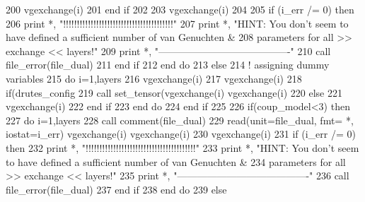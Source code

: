 \begin{DoxyCode}
200             vgexchange(i)%
201 \textcolor{keywordflow}{        end if}
202 
203         vgexchange(i)%
204 
205         \textcolor{keywordflow}{if} (i\_err /= 0) \textcolor{keywordflow}{then}
206           print *, \textcolor{stringliteral}{"!!!!!!!!!!!!!!!!!!!!!!!!!!!!!!!!!!!!!!!!"}
207           print *, \textcolor{stringliteral}{"HINT: You don't seem to have defined a sufficient number of van Genuchten &}
208 \textcolor{stringliteral}{}\textcolor{stringliteral}{           parameters for all >> exchange << layers!"}
209           print *, \textcolor{stringliteral}{"----------------------------------------"}
210           \textcolor{keyword}{call }file_error(file\_dual)
211 \textcolor{keywordflow}{        end if}
212 \textcolor{keywordflow}{      end do}
213     \textcolor{keywordflow}{else}
214     \textcolor{comment}{! assigning dummy variables}
215       \textcolor{keywordflow}{do} i=1,layers
216         vgexchange(i)%
217         vgexchange(i)%
218         \textcolor{keywordflow}{if}(drutes_config%
219             \textcolor{keyword}{call }set_tensor(vgexchange(i)%
      vgexchange(i)%
220         \textcolor{keywordflow}{else}
221             vgexchange(i)%
222 \textcolor{keywordflow}{        end if}
223 \textcolor{keywordflow}{      end do}
224 \textcolor{keywordflow}{    end if}
225     
226     \textcolor{keywordflow}{if}(coup_model<3) \textcolor{keywordflow}{then}
227      \textcolor{keywordflow}{do} i=1,layers
228         \textcolor{keyword}{call }comment(file\_dual)
229         \textcolor{keyword}{read}(unit=file\_dual, fmt= *, iostat=i\_err) vgexchange(i)%
      vgexchange(i)%
230         vgexchange(i)%
231         \textcolor{keywordflow}{if} (i\_err /= 0) \textcolor{keywordflow}{then}
232           print *, \textcolor{stringliteral}{"!!!!!!!!!!!!!!!!!!!!!!!!!!!!!!!!!!!!!!!!"}
233           print *, \textcolor{stringliteral}{"HINT: You don't seem to have defined a sufficient number of van Genuchten &}
234 \textcolor{stringliteral}{}\textcolor{stringliteral}{           parameters for all >> exchange << layers!"}
235           print *, \textcolor{stringliteral}{"----------------------------------------"}
236           \textcolor{keyword}{call }file_error(file\_dual)
237 \textcolor{keywordflow}{        end if}
238 \textcolor{keywordflow}{      end do}
239      \textcolor{keywordflow}{else}

\end{DoxyCode}
